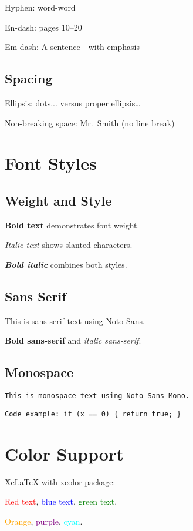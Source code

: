 \documentclass[12pt,a4paper]{article}
\begin{document}
Hyphen: word-word

En-dash: pages 10--20

Em-dash: A sentence---with emphasis

\subsection{Spacing}
Ellipsis: dots... versus proper ellipsis…

Non-breaking space: Mr.~Smith (no line break)

\section{Font Styles}

\subsection{Weight and Style}

\textbf{Bold text} demonstrates font weight.

\textit{Italic text} shows slanted characters.

\textbf{\textit{Bold italic}} combines both styles.

\subsection{Sans Serif}

\textsf{This is sans-serif text using Noto Sans.}

\textsf{\textbf{Bold sans-serif}} and \textsf{\textit{italic sans-serif}}.

\subsection{Monospace}

\texttt{This is monospace text using Noto Sans Mono.}

\texttt{Code example: if (x == 0) \{ return true; \}}

\section{Color Support}

XeLaTeX with xcolor package:

\textcolor{red}{Red text}, \textcolor{blue}{blue text}, \textcolor{green}{green text}.

\textcolor{orange}{Orange}, \textcolor{purple}{purple}, \textcolor{cyan}{cyan}.
\end{document}
